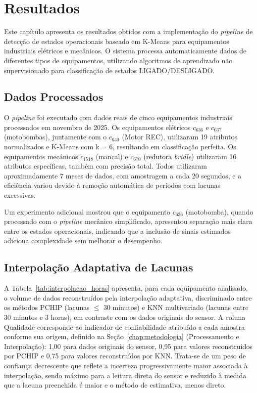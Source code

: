 \newpage
\chapter{Resultados}
\label{chap:resultados}

Este capítulo apresenta os resultados obtidos com a implementação do \textit{pipeline} de detecção de estados operacionais baseado em K-Means para equipamentos industriais elétricos e mecânicos. O sistema processa automaticamente dados de diferentes tipos de equipamentos, utilizando algoritmos de aprendizado não supervisionado para classificação de estados LIGADO/DESLIGADO.

\section{Dados Processados}

O \textit{pipeline} foi executado com dados reais de cinco equipamentos industriais processados em novembro de 2025. Os equipamentos elétricos $c_{636}$ e $c_{637}$ (motobombas), juntamente com o $c_{640}$ (Motor REC), utilizaram 19 atributos normalizados e K-Means com k = 6, resultando em classificação perfeita. Os equipamentos mecânicos $c_{1518}$ (mancal) e $c_{670}$ (redutora \textit{bridle}) utilizaram 16 atributos específicas, também com precisão total. Todos utilizaram aproximadamente 7 meses de dados, com amostragem a cada 20 segundos, e a eficiência variou devido à remoção automática de períodos com lacunas excessivas.

Um experimento adicional mostrou que o equipamento $c_{636}$ (motobomba), quando processado com o \textit{pipeline} mecânico simplificado, apresentou separação mais clara entre os estados operacionais, indicando que a inclusão de sinais estimados adiciona complexidade sem melhorar o desempenho.

\section{Interpolação Adaptativa de Lacunas}
\label{sec:resultados_interpolacao}

A Tabela~\ref{tab:interpolacao_horas} apresenta, para cada equipamento analisado, o volume de dados reconstruídos pela interpolação adaptativa, discriminado entre os métodos PCHIP (lacunas $\leq$ 30 minutos) e KNN multivariado (lacunas entre 30 minutos e 3 horas), em contraste com os dados originais do sensor. A coluna Qualidade corresponde ao indicador de confiabilidade atribuído a cada amostra conforme sua origem, definido na Seção~\ref{chap:metodologia} (Processamento e Interpolação): 1,00 para dados originais do sensor, 0,95 para valores reconstruídos por PCHIP e 0,75 para valores reconstruídos por KNN. Trata-se de um peso de confiança decrescente que reflete a incerteza progressivamente maior associada à interpolação, sendo máximo para a leitura direta do sensor e reduzido à medida que a lacuna preenchida é maior e o método de estimativa, menos direto.

